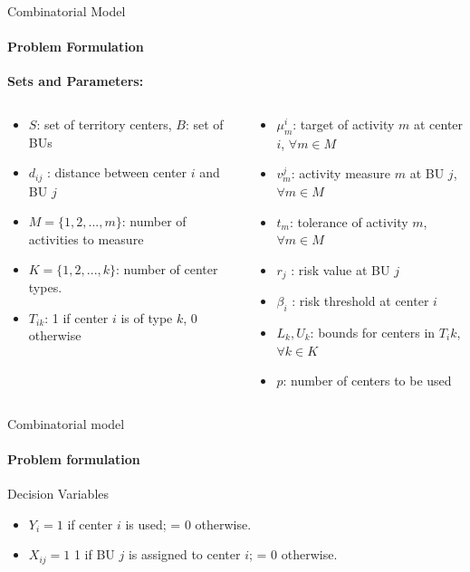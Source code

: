 \documentclass{beamer}
\begin{document}
\begin{frame}{Combinatorial Model}
    \framesubtitle{Problem Formulation}

    \textbf{Sets and Parameters:}
    \begin{columns}
        \begin{column}{0.5\textwidth}
            \begin{itemize}
                \item $S$: set of territory centers, $B$: set of BUs
                \item $d_{ij}$ : distance between center $i$ and BU $j$
                \item $M = \{1,2, ..., m\}$: number of activities to measure
                \item $K = \{1, 2, ..., k\}$: number of center types.
                \item $T_{ik}$: 1 if center $i$ is of type $k$, 0 otherwise
            \end{itemize}
        \end{column}
        \begin{column}{0.5\textwidth}
            \begin{itemize}
                \item $\mu_m^i$: target of activity $m$ at center $i$, $\forall m \in M$
                \item $v_m^j$: activity measure $m$ at BU $j$, $\forall m \in M$
                \item $t_m$: tolerance of activity $m$, $\forall m \in M$
                \item $r_j$ : risk value at BU $j$
                \item $\beta_i$ : risk threshold at center $i$
                \item $L_k, U_k$: bounds for centers in $T_ik$, $\forall k \in K$
                \item $p$: number of centers to be used
            \end{itemize}
        \end{column}
    \end{columns}
\end{frame}

\begin{frame}{Combinatorial model}
    \framesubtitle{Problem formulation}
        Decision Variables 
        \begin{itemize}
            \item \small $Y_i = 1$ if center $i$ is used; = 0 otherwise.
            \item \small $X_{ij} = 1$ 1 if BU $j$ is assigned to center $i$; = 0 otherwise.
        \end{itemize}
\end{frame}
\end{document}
